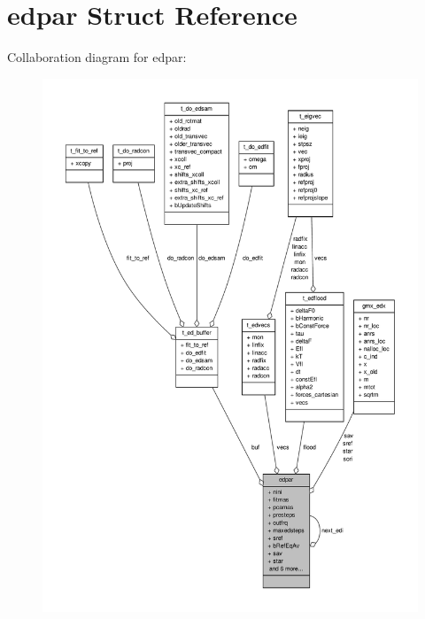 \hypertarget{structedpar}{\section{edpar \-Struct \-Reference}
\label{structedpar}
}


\-Collaboration diagram for edpar\-:
\nopagebreak
\begin{figure}[H]
\begin{center}
\leavevmode
\includegraphics[width=350pt]{structedpar__coll__graph}
\end{center}
\end{figure}
